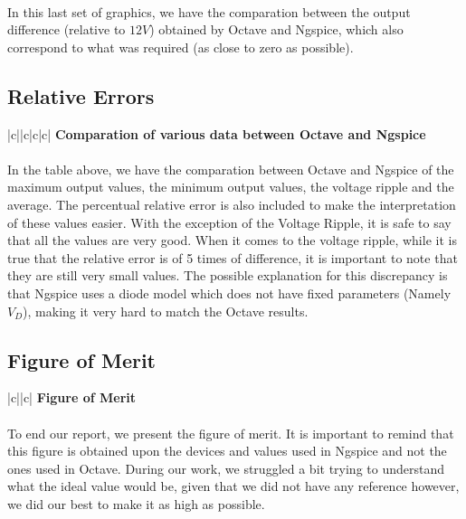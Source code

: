\paragraph{}
In this last set of graphics, we have the comparation between the output difference (relative to $12V$) obtained by Octave and Ngspice, which also correspond to what was required (as close to zero as possible).

\subsection{Relative Errors}
\label{subsec:fourth_topic_error}

\begin{center}
   \begin{tabular}{|c||c|c|c|}
      \hline    
       {\bf Comparation of various data between Octave and Ngspice} \\
      \hline
        
   \end{tabular}
\end{center}

\paragraph{}
In the table above, we have the comparation between Octave and Ngspice of the maximum output values, the minimum output values, the voltage ripple and the average. The percentual relative error is also included to make the interpretation of these values easier.
With the exception of the Voltage Ripple, it is safe to say that all the values are very good. When it comes to the voltage ripple, while it is true that the relative error is of 5 times of difference, it is important to note that they are still very small values. The possible explanation for this discrepancy is that Ngspice uses a diode model which does not have fixed parameters (Namely $V_{D}$), making it very hard to match the Octave results.

\subsection{Figure of Merit}
\label{subsec:Figure_of_Merit}

\begin{center}
   \begin{tabular}{|c||c|}
      \hline    
       {\bf Figure of Merit} \\
      \hline
        
   \end{tabular}
 \end{center}

\paragraph{}
To end our report, we present the figure of merit. It is important to remind that this figure is obtained upon the devices and values used in Ngspice and not the ones used in Octave. During our work, we struggled a bit trying to understand what the ideal value would be, given that we did not have any reference however, we did our best to make it as high as possible.
